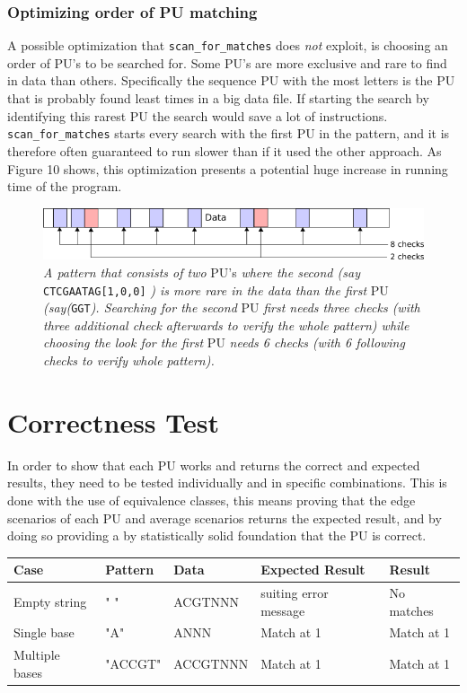 \documentclass[12pt]{article}
\newcommand{\scm}{\texttt{scan\_for\_matches} }
\newcommand{\pu}{PU }
\newcommand{\pus}{PU's }
\begin{document}
\subsubsection{Optimizing order of \pu matching}
A possible optimization that \scm does \textit{not} exploit, is choosing an order of \pus to be searched for.
Some \pus are more exclusive and rare to find in data than others. Specifically the sequence \pu with the most
letters is the \pu that is probably found least times in a big data file. If starting the search by
identifying this rarest \pu the search would save a lot of instructions. \scm starts every search with the 
first \pu in the pattern, and it is therefore often guaranteed to run slower than if it used the other approach.
As Figure 10 shows, this optimization presents a potential huge increase in running time of the program. \newpage
\begin{figure}[H]
\begin{center}
\includegraphics[scale=0.8]{Diagrams/opti.png}
\end{center}
\caption{\textit{A pattern that consists of two} \pus \textit{where the second (say} \texttt{CTCGAATAG[1,0,0]}
\textit{) is more rare in the data than the first} \pu \textit{(say(}\texttt{GGT}\textit{). Searching for the 
second} \pu \textit{first needs three checks (with three additional check afterwards to verify the whole pattern)
while choosing the look for the first} \pu \textit{needs 6 checks (with 6 following checks to verify whole pattern).}}
\end{figure}



\section{Correctness Test}
In order to show that each \pu works and returns the correct and expected results, they need to be tested individually and in specific combinations. This is done with the use of equivalence classes, this means proving that the edge scenarios of each 
\pu and average scenarios returns the expected result, and by doing so providing a by statistically solid foundation that 
the \pu is correct. 

\begin{table}[H]
\begin{tabular}{p{4cm}|p{3.6cm}|p{2.5cm}|p{2.2cm}|p{2.2cm}}
Case 			& Pattern & Data & Expected Result & Result \\ \hline
Empty string		& " " & ACGTNNN & suiting error message & No matches \\ \hline
Single base 		& "A" & ANNN & Match at 1 & Match at 1\\ \hline
Multiple bases	& "ACCGT" & ACCGTNNN & Match at 1 & Match at 1 \\ \hline
\end{tabular}
\end{table}
\end{document}
